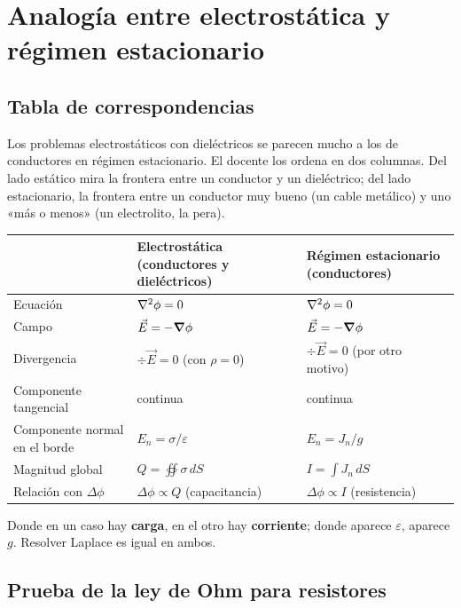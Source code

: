 \documentclass[12pt,a4paper]{article}
\begin{document}
\section{Analogía entre electrostática y régimen estacionario}

\subsection{Tabla de correspondencias}

Los problemas electrostáticos con dieléctricos se parecen mucho a los de
conductores en régimen estacionario. El docente los ordena en dos columnas. Del
lado estático mira la frontera entre un conductor y un dieléctrico; del lado
estacionario, la frontera entre un conductor muy bueno (un cable metálico) y uno
«más o menos» (un electrolito, la pera).

\begin{center}
\renewcommand{\arraystretch}{1.35}
\small
\begin{tabularx}{\textwidth}{>{\raggedright\arraybackslash}X>{\raggedright\arraybackslash}X>{\raggedright\arraybackslash}X}
\toprule
 & \textbf{Electrostática (conductores y dieléctricos)} & \textbf{Régimen estacionario (conductores)} \\
\midrule
Ecuación & $\laplacian \phi = 0$ & $\laplacian \phi = 0$ \\
Campo & $\vec E = -\vnabla\phi$ & $\vec E = -\vnabla\phi$ \\
Divergencia & $\div \vec E = 0$ (con $\rho = 0$) & $\div \vec E = 0$ (por otro motivo) \\
Componente tangencial & continua & continua \\
Componente normal en el borde & $E_n = \sigma/\varepsilon$ & $E_n = J_n/g$ \\
Magnitud global & $Q = \oiint \sigma\,dS$ & $I = \int J_n\,dS$ \\
Relación con $\Delta\phi$ & $\Delta\phi \propto Q$ (capacitancia) & $\Delta\phi \propto I$ (resistencia) \\
\bottomrule
\end{tabularx}
\end{center}

Donde en un caso hay \textbf{carga}, en el otro hay \textbf{corriente}; donde aparece
$\varepsilon$, aparece $g$. Resolver Laplace es igual en ambos.

\subsection{Prueba de la ley de Ohm para resistores}
\end{document}
